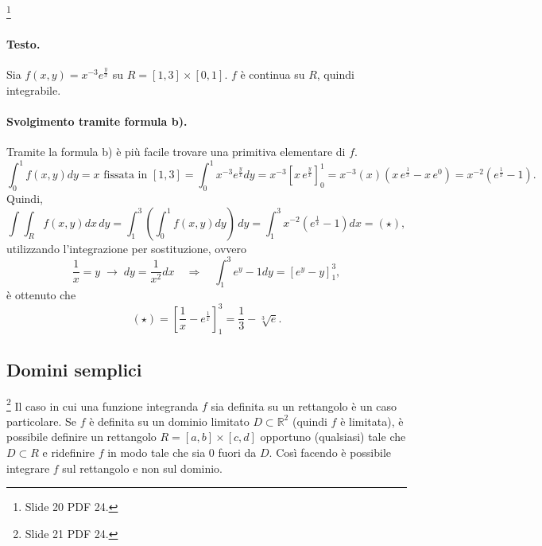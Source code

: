 \begin{example}\footnote{Slide 20 PDF 24.}
	\paragraph{Testo.} Sia $f(x,y)=x^{-3}e^{\frac{y}{x}}$ su $R=[1, 3]\times[0,1]$. $f$ è continua su $R$, quindi integrabile.
	\paragraph{Svolgimento tramite formula b).} Tramite la formula b) è più facile trovare una primitiva elementare di $f$.
	\begin{equation*}
		\int_0^1 f(x,y) dy = x\text{ fissata in } [1,3] = \int_0^1 x^{-3} e^{\frac{y}{x}}  dy = x^{-3}\left[x\, e^{\frac{y}{x}}\right]^1_0 =  x^{-3} (x) \left(x\, e^{\frac{1}{x}} - x\, e^0 \right) = x^{-2} \left(e^{\frac{1}{x}} - 1\right).
	\end{equation*}
	Quindi,
	\begin{equation*}
		\int\int_R f(x,y) dx\, dy = \int_1^3\left(\int_0^1 f(x,y) dy\right)\, dy = \int_1^3 x^{-2}\left(e^{\frac{1}{x}}-1\right) dx = (\star),
	\end{equation*}
	utilizzando l'integrazione per sostituzione, ovvero
	\begin{equation*}
		 \frac{1}{x} = y \;\rightarrow\; dy=\frac{1}{x^2}dx \quad\Longrightarrow\quad \int_1^3e^y -1 dy = \left[e^y-y\right]_1^3 ,
	\end{equation*}
	è ottenuto che
	\begin{equation*}
		(\star) = \left[\frac{1}{x} - e^{\frac{1}{x}}\right]^3_1 = \frac{1}{3} - \sqrt[3]{e}.
	\end{equation*}
\end{example}

\subsection{Domini semplici}
\footnote{Slide 21 PDF 24.} Il caso in cui una funzione integranda $f$ sia definita su un rettangolo è un caso particolare. Se $f$ è definita su un dominio limitato $D\subset\mathbb{R}^2$ (quindi $f$ è limitata), è possibile definire un rettangolo $R=[a,b]\times [c,d]$ opportuno (qualsiasi) tale che $D\subset R$ e ridefinire $f$ in modo tale che sia 0 fuori da $D$. Così facendo è possibile integrare $f$ sul rettangolo e non sul dominio.


